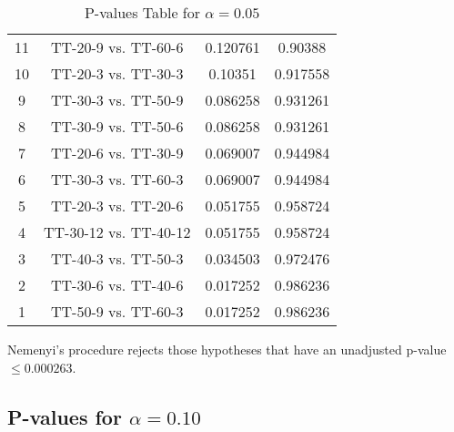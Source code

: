 \documentclass[a4paper,10pt]{article}
\begin{document}
\begin{landscape}
\begin{table}[!htp]
\begin{tabular}{cccc}
11&TT-20-9 vs. TT-60-6&0.120761&0.90388\\
10&TT-20-3 vs. TT-30-3&0.10351&0.917558\\
9&TT-30-3 vs. TT-50-9&0.086258&0.931261\\
8&TT-30-9 vs. TT-50-6&0.086258&0.931261\\
7&TT-20-6 vs. TT-30-9&0.069007&0.944984\\
6&TT-30-3 vs. TT-60-3&0.069007&0.944984\\
5&TT-20-3 vs. TT-20-6&0.051755&0.958724\\
4&TT-30-12 vs. TT-40-12&0.051755&0.958724\\
3&TT-40-3 vs. TT-50-3&0.034503&0.972476\\
2&TT-30-6 vs. TT-40-6&0.017252&0.986236\\
1&TT-50-9 vs. TT-60-3&0.017252&0.986236\\
\hline
\end{tabular}
\caption{P-values Table for $\alpha=0.05$}
\end{table}Nemenyi's procedure rejects those hypotheses that have an unadjusted p-value $\le0.000263$.

\pagebreak

\subsection{P-values for $\alpha=0.10$}


\end{landscape}
\end{document}
